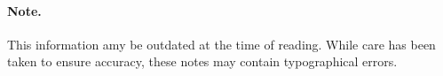 \documentclass[10pt]{article}
\title{}
\author{}
\date{}
\begin{document}
\maketitle

\newpage

\paragraph{Note.} This information amy be outdated at the time of reading. 
While care has been taken to ensure accuracy, these notes may contain typographical errors. \\

\tableofcontents

\newpage
\end{document}
